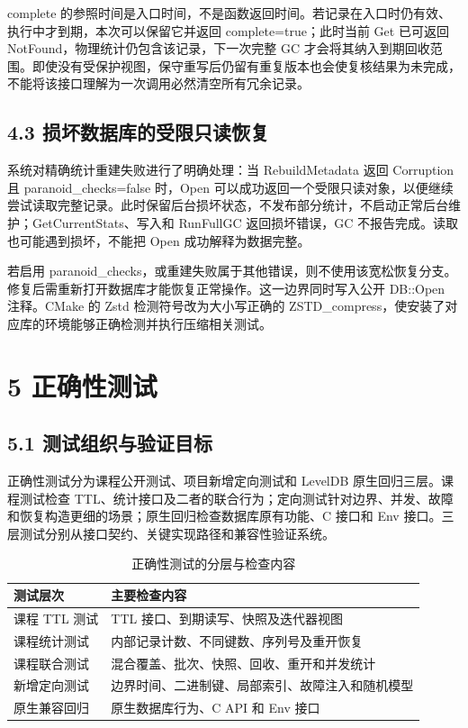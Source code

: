 \documentclass[UTF8,a4paper,10pt,twocolumn,fontset=fandol]{ctexart}
\begin{document}
complete 的参照时间是入口时间，不是函数返回时间。若记录在入口时仍有效、执行中才到期，本次可以保留它并返回 complete=true；此时当前 Get 已可返回 NotFound，物理统计仍包含该记录，下一次完整 GC 才会将其纳入到期回收范围。即使没有受保护视图，保守重写后仍留有重复版本也会使复核结果为未完成，不能将该接口理解为一次调用必然清空所有冗余记录。

\subsection*{4.3 损坏数据库的受限只读恢复}
系统对精确统计重建失败进行了明确处理：当 RebuildMetadata 返回 Corruption 且 paranoid\_checks=false 时，Open 可以成功返回一个受限只读对象，以便继续尝试读取完整记录。此时保留后台损坏状态，不发布部分统计，不启动正常后台维护；GetCurrentStats、写入和 RunFullGC 返回损坏错误，GC 不报告完成。读取也可能遇到损坏，不能把 Open 成功解释为数据完整。

若启用 paranoid\_checks，或重建失败属于其他错误，则不使用该宽松恢复分支。修复后需重新打开数据库才能恢复正常操作。这一边界同时写入公开 DB::Open 注释。CMake 的 Zstd 检测符号改为大小写正确的 ZSTD\_compress，使安装了对应库的环境能够正确检测并执行压缩相关测试。

\section*{5 正确性测试}
\subsection*{5.1 测试组织与验证目标}
正确性测试分为课程公开测试、项目新增定向测试和 LevelDB 原生回归三层。课程测试检查 TTL、统计接口及二者的联合行为；定向测试针对边界、并发、故障和恢复构造更细的场景；原生回归检查数据库原有功能、C 接口和 Env 接口。三层测试分别从接口契约、关键实现路径和兼容性验证系统。

\begin{table}[htbp]
\centering\small
\setlength{\tabcolsep}{4pt}
\renewcommand{\arraystretch}{1.2}
\caption{正确性测试的分层与检查内容}
\label{tab:correctness-scope}
\begin{tabularx}{\columnwidth}{@{}lY@{}}
\toprule
测试层次 & 主要检查内容 \\
\midrule
课程 TTL 测试 & TTL 接口、到期读写、快照及迭代器视图 \\
课程统计测试 & 内部记录计数、不同键数、序列号及重开恢复 \\
课程联合测试 & 混合覆盖、批次、快照、回收、重开和并发统计 \\
新增定向测试 & 边界时间、二进制键、局部索引、故障注入和随机模型 \\
原生兼容回归 & 原生数据库行为、C API 和 Env 接口 \\
\bottomrule
\end{tabularx}
\end{table}
\end{document}
